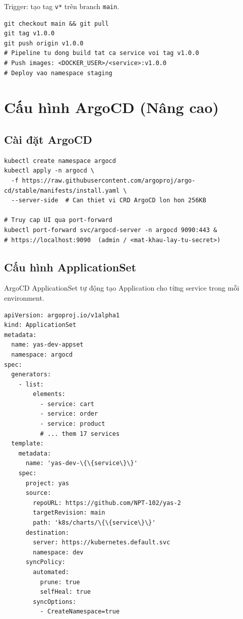 Trigger: tạo tag \texttt{v*} trên branch \texttt{main}.
\begin{lstlisting}[style=bashstyle, caption=Tạo staging release]
git checkout main && git pull
git tag v1.0.0
git push origin v1.0.0
# Pipeline tu dong build tat ca service voi tag v1.0.0
# Push images: <DOCKER_USER>/<service>:v1.0.0
# Deploy vao namespace staging
\end{lstlisting}

\section{Cấu hình ArgoCD (Nâng cao)}

\subsection{Cài đặt ArgoCD}

\begin{lstlisting}[style=bashstyle, caption=Cài ArgoCD với server-side apply]
kubectl create namespace argocd
kubectl apply -n argocd \
  -f https://raw.githubusercontent.com/argoproj/argo-cd/stable/manifests/install.yaml \
  --server-side  # Can thiet vi CRD ArgoCD lon hon 256KB

# Truy cap UI qua port-forward
kubectl port-forward svc/argocd-server -n argocd 9090:443 &
# https://localhost:9090  (admin / <mat-khau-lay-tu-secret>)
\end{lstlisting}

\subsection{Cấu hình ApplicationSet}

ArgoCD ApplicationSet tự động tạo Application cho từng service trong mỗi environment.

\begin{lstlisting}[style=yamlstyle, caption=ArgoCD ApplicationSet cho môi trường dev]
apiVersion: argoproj.io/v1alpha1
kind: ApplicationSet
metadata:
  name: yas-dev-appset
  namespace: argocd
spec:
  generators:
    - list:
        elements:
          - service: cart
          - service: order
          - service: product
          # ... them 17 services
  template:
    metadata:
      name: 'yas-dev-\{\{service\}\}'
    spec:
      project: yas
      source:
        repoURL: https://github.com/NPT-102/yas-2
        targetRevision: main
        path: 'k8s/charts/\{\{service\}\}'
      destination:
        server: https://kubernetes.default.svc
        namespace: dev
      syncPolicy:
        automated:
          prune: true
          selfHeal: true
        syncOptions:
          - CreateNamespace=true
\end{lstlisting}


